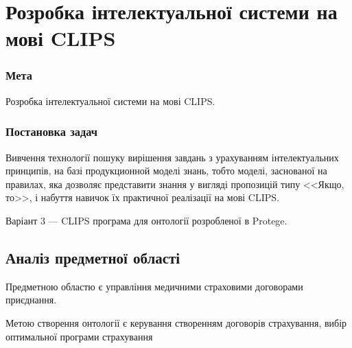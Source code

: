 



\newcommand{\labnumber}{2} %



\graphicspath{{figures/}}


\Ukrainian


\addtocounter{page}{1}

\section{Розробка інтелектуальної системи на мові CLIPS}
\subsubsection*{Мета}
Розробка інтелектуальної системи на мові CLIPS.
\subsubsection*{Постановка задач}
Вивчення технології пошуку вирішення завдань з урахуванням інтелектуальних принципів, на базі продукционной моделі знань, тобто моделі, заснованої на правилах, яка дозволяє представити знання у вигляді пропозицій типу <<Якщо, то>>, і набуття навичок їх практичної реалізації на мові CLIPS.

\begin{center}
    Варіант 3 --- CLIPS програма для онтології розробленої в Protege.
\end{center}

\subsection{Аналіз предметної області}
Предметною областю є управління медичними страховими договорами приєднання.

Метою створення онтології є керування створенням договорів страхування, вибір оптимальної програми страхування  

